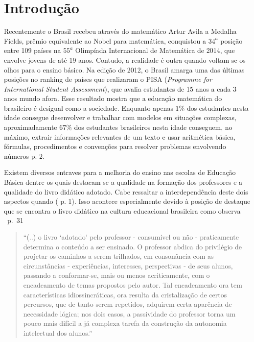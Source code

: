 \documentclass[10 pt]{article}
\begin{document}
\section{Introdução}

Recentemente o Brasil recebeu através do matemático Artur Avila a Medalha Fields, prêmio equivalente ao Nobel para matemática, conquistou a $34^a$ posição entre 109 países na $55^a$ Olimpíada Internacional de Matemática de 2014, que envolve jovens de até 19 anos.
Contudo, a realidade é outra quando voltam-se os olhos para o ensino básico. Na edição de 2012, o Brasil amarga uma das últimas posições no ranking de países que realizaram o PISA ({\it Programme for International Student Assessment}), que avalia estudantes de 15 anos a cada 3 anos mundo afora.
Esse resultado mostra que a educação matemática do brasileiro é desigual como a sociedade.
Enquanto apenas $1\%$ dos estudantes nesta idade consegue desenvolver e trabalhar com modelos em situações complexas, aproximadamente $67\%$ dos estudantes brasileiros nesta idade conseguem, no máximo, extrair informações relevantes de um texto e usar aritmética básica, fórmulas, procedimentos e convenções para resolver problemas envolvendo números \cite[Country Note - Brazil]{pisa2012} p. 2.

Existem diversos entraves para a melhoria do ensino nas escolas de Educação Básica dentre os quais destacam-se a qualidade na formação dos professores e a qualidade do livro didático adotado.
Cabe ressaltar a interdependência deste dois aspectos quando  (\cite{lima2001exame} p. 1). Isso acontece especialmente devido à posição de destaque que se encontra o livro didático na cultura educacional brasileira como observa \cite{machado}~p.~31

\blockquote{``(..) o livro `adotado' pelo professor - consumível ou não - praticamente determina o conteúdo a ser ensinado.
O professor abdica do privilégio de projetar os caminhos a serem trilhados, em consonância com as circunstâncias - experiências, interesses, perspectivas - de seus alunos, passando a conformar-se, mais ou menos acriticamente, com o encadeamento de temas propostos pelo autor.
 Tal encadeamento ora tem características idiossincráticas, ora resulta da cristalização de certos percursos, que de tanto serem repetidos, adquirem certa aparência de necessidade lógica; nos dois casos, a passividade do professor torna um pouco mais difícil a já complexa tarefa da construção da autonomia intelectual dos alunos.''}
\end{document}
